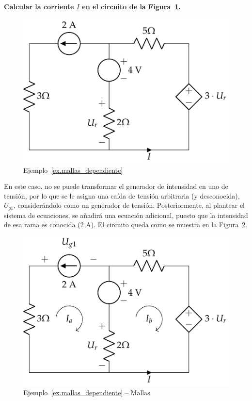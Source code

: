 	\begin{example}\label{ex.mallas_dependiente}
	    \textbf{Calcular la corriente $I$ en el circuito de la Figura~\ref{fig.ejemplo_mallas_dependiente}.}
	    \begin{figure}[H]
	        \centering
	        \includegraphics[width=0.35\linewidth]{../figs/ejemplo_mallas_dependiente.pdf}
	        \caption{Ejemplo~\ref{ex.mallas_dependiente}}
	        \label{fig.ejemplo_mallas_dependiente}
	    \end{figure}
	    
	    En este caso, no se puede transformar el generador de intensidad en uno de tensión, por lo que  se le asigna una caída de tensión arbitraria (y desconocida), $U_{g1}$, considerándolo como un generador de tensión. Posteriormente, al plantear el sistema de ecuaciones, se añadirá una ecuación adicional, puesto que la intensidad de esa rama es conocida (2 A). El circuito queda como se muestra en la Figura~\ref{fig.mallas_dpendiente_sol}.
	    \begin{figure}[H]
	        \centering
	        \includegraphics[width=0.35\linewidth]{../figs/ejemplo_mallas_dependiente_sol.pdf}
	        \caption{Ejemplo~\ref{ex.mallas_dependiente} -- Mallas}
	        \label{fig.mallas_dpendiente_sol}
	    \end{figure}
	    

\end{example}
